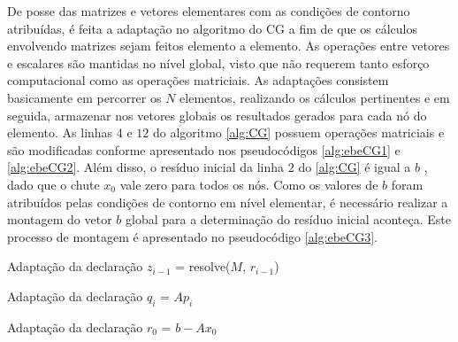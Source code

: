 \documentclass[
    12pt,               %
    openright,          %
    oneside,
    a4paper,            %
    english,            %
    french,             %
    spanish,            %
    brazil              %
    ]{abntex2}
\begin{document}
De posse das matrizes e vetores elementares com as condições de contorno atribuídas, é feita a adaptação no algoritmo do  CG a fim de que os cálculos envolvendo matrizes sejam feitos elemento a elemento. As operações entre vetores e escalares são mantidas no nível global, visto que não requerem tanto esforço computacional como as operações matriciais.  As adaptações consistem basicamente em percorrer os $N$ elementos, realizando os cálculos pertinentes e em seguida, armazenar nos vetores globais os resultados gerados para cada nó do elemento. As linhas $4$ e $12$ do algoritmo \ref{alg:CG} possuem operações matriciais e são modificadas conforme apresentado nos pseudocódigos \ref{alg:ebeCG1} e \ref{alg:ebeCG2}. Além disso, o resíduo inicial da linha $2$ do \ref{alg:CG} é igual a $b$ , dado que o chute $x_0$ vale zero para todos os nós. Como os valores de $b$ foram atribuídos pelas condições de contorno em nível elementar, é necessário realizar a montagem do vetor $b$ global para a determinação do resíduo inicial aconteça. Este processo de montagem é apresentado no pseudocódigo \ref{alg:ebeCG3}.

\begin{algorithm}	
	\caption{\label{alg:ebeCG1}Adaptação da declaração $z_{i-1}$ = resolve($M$, $r_{i-1}$)} 
	\begin{algorithmic}[1]
		\EndFor
	\end{algorithmic}
\end{algorithm}

\begin{algorithm}	
	\caption{\label{alg:ebeCG2}Adaptação da declaração $q_i$ = $Ap_i$} 
	\begin{algorithmic}[1]
		\EndFor
	\end{algorithmic}
\end{algorithm}

\begin{algorithm}	
	\caption{\label{alg:ebeCG3}Adaptação da declaração $r_{0}$ = $b - Ax_{0}$} 
	\begin{algorithmic}[1]
		\EndFor
	\end{algorithmic}
\end{algorithm}
\end{document}
